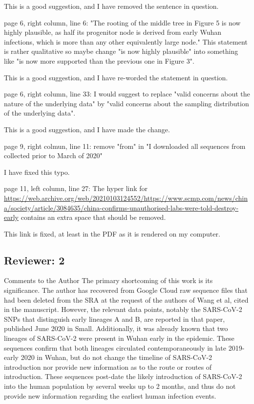 \documentclass[11pt, oneside]{article}   	%
\newcommand{\response}[1]{{\color{black}#1}}
\begin{document}
\response{This is a good suggestion, and I have removed the sentence in question.}

page 6, right column, line 6: "The rooting of the middle tree in Figure 5 is now highly plausible, as half its progenitor node is derived from early Wuhan infections, which is more than any other equivalently large node." This statement is rather qualitative so maybe change  "is now highly plausible" into something like "is now more supported than the previous one in Figure 3".

\response{This is a good suggestion, and I have re-worded the statement in question.}

page 6, right column, line 33: I would suggest to replace "valid concerns about the nature of the underlying data" by "valid concerns about the sampling distribution of the underlying data".

\response{This is a good suggestion, and I have made the change.}

page 9, right colmun, line 11: remove "from" in "I downloaded all sequences from collected prior to March of 2020"

\response{I have fixed this typo.}

page 11, left column, line 27: The hyper link for \url{https://web.archive.org/web/20210103124552/https://www.scmp.com/news/china/society/article/3084635/china-confirms-unauthorised-labs-were-told-destroy-early}  contains an extra space that should be removed.

\response{This link is fixed, at least in the PDF as it is rendered on my computer.}


\subsection*{Reviewer: 2}

Comments to the Author
The primary shortcoming of this work is its significance. The author has recovered from Google Cloud raw sequence files that had been deleted from the SRA at the request of the authors of Wang et al, cited in the manuscript. However, the relevant data points, notably the SARS-CoV-2 SNPs that distinguish early lineages A and B, are reported in that paper, published June 2020 in Small. Additionally, it was already known that two lineages of SARS-CoV-2 were present in Wuhan early in the epidemic. These sequences confirm that both lineages circulated contemporaneously in late 2019-early 2020 in Wuhan, but do not change the timeline of SARS-CoV-2 introduction nor provide new information as to the route or routes of introduction. These sequences post-date the likely introduction of SARS-CoV-2 into the human population by several weeks up to 2 months, and thus do not provide new information regarding the earliest human infection events.
\end{document}
